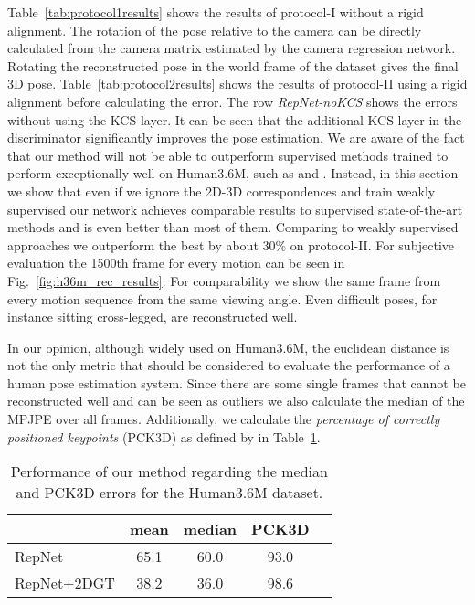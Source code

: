 \documentclass[10pt,twocolumn,letterpaper]{article}
\begin{document}
Table~\ref{tab:protocol1results} shows the results of protocol-I without a rigid alignment.
The rotation of the pose relative to the camera can be directly calculated from the camera matrix estimated by the camera regression network.
Rotating the reconstructed pose in the world frame of the dataset gives the final 3D pose.
Table~\ref{tab:protocol2results} shows the results of protocol-II using a rigid alignment before calculating the error.
The row \textit{RepNet-noKCS} shows the errors without using the KCS layer.
It can be seen that the additional KCS layer in the discriminator significantly improves the pose estimation.
We are aware of the fact that our method will not be able to outperform supervised methods trained to perform exceptionally well on Human3.6M, such as \cite{martinez_2017_3dbaseline} and \cite{OriNet2018}.
Instead, in this section we show that even if we ignore the 2D-3D correspondences and train weakly supervised our network achieves comparable results to supervised state-of-the-art methods and is even better than most of them.
Comparing to weakly supervised approaches \cite{3dinterpreter2016,AIGN2017} we outperform the best by about 30\% on protocol-II.
For subjective evaluation the 1500th frame for every motion can be seen in Fig.~\ref{fig:h36m_rec_results}.
For comparability we show the same frame from every motion sequence from the same viewing angle.
Even difficult poses, for instance sitting cross-legged, are reconstructed well.

In our opinion, although widely used on Human3.6M, the euclidean distance is not the only metric that should be considered to evaluate the performance of a human pose estimation system.
Since there are some single frames that cannot be reconstructed well and can be seen as outliers we also calculate the median of the MPJPE over all frames.
Additionally, we calculate the \textit{percentage of correctly positioned keypoints} (PCK3D) as defined by \cite{mpii3dhp2017} in Table~\ref{tab:pck_h36m}.

\begin{table}[htp]
	\footnotesize
	\caption{Performance of our method regarding the median and PCK3D errors for the Human3.6M dataset.}
	\centering
	\begin{tabular}{l|cccc}
 		 & mean & median & PCK3D \\
		\hline
\rowcolor{grayLight}
		RepNet  & 65.1 & 60.0 & 93.0 \\
		\rowcolor{grayDark}
		RepNet+2DGT  & 38.2 & 36.0 & 98.6 \\
	\end{tabular}
	\label{tab:pck_h36m}
\end{table}
\end{document}
